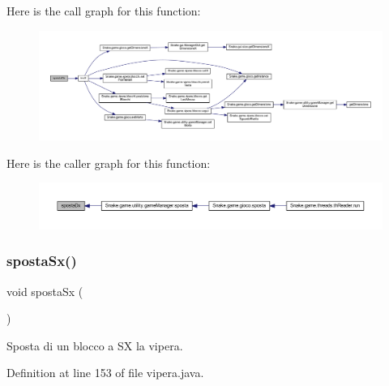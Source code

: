Here is the call graph for this function\+:
\nopagebreak
\begin{figure}[H]
\begin{center}
\leavevmode
\includegraphics[width=350pt]{class_snake_1_1game_1_1vipera_1_1vipera_a2bb91b033817cdbd85ff3c137b3d32db_cgraph}
\end{center}
\end{figure}
Here is the caller graph for this function\+:
\nopagebreak
\begin{figure}[H]
\begin{center}
\leavevmode
\includegraphics[width=350pt]{class_snake_1_1game_1_1vipera_1_1vipera_a2bb91b033817cdbd85ff3c137b3d32db_icgraph}
\end{center}
\end{figure}
\mbox{\label{class_snake_1_1game_1_1vipera_1_1vipera_a1f636041d5b342db6f92850f6d19da55}} 
\subsubsection{\texorpdfstring{sposta\+Sx()}{spostaSx()}}
{\footnotesize\ttfamily void sposta\+Sx (\begin{DoxyParamCaption}{ }\end{DoxyParamCaption})}



Sposta di un blocco a SX la vipera. 



Definition at line 153 of file vipera.\+java.

